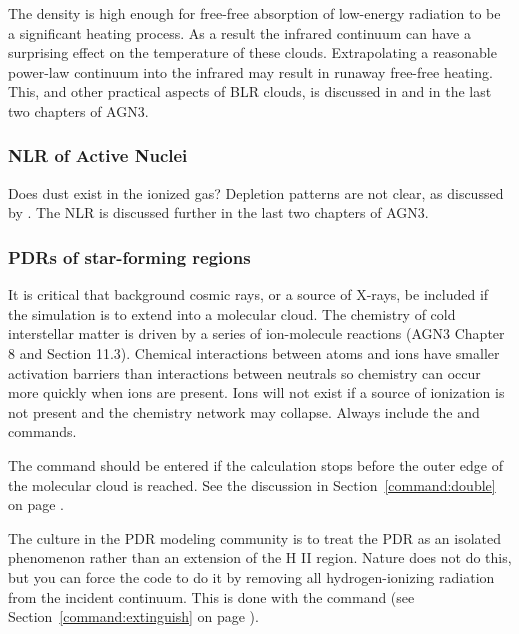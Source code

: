 \documentclass[12pt,twoside]{article}
\begin{document}
{The density is high enough for free-free absorption of low-energy
radiation to be a significant heating process.
As a result the infrared
continuum can have a surprising effect on the temperature of these clouds.
Extrapolating a reasonable power-law continuum into the infrared may result
in runaway free-free heating.
This, and other practical aspects of BLR
clouds, is discussed in \citet{FerlandBLRCloudReview99}
and in the last two chapters of AGN3.

\subsubsection{NLR of Active Nuclei}

Does dust exist in the ionized gas?  Depletion patterns are not clear,
as discussed by \citet{FergusonEtAl97}.
The NLR is discussed further in the last two chapters of AGN3.

\subsubsection{PDRs of star-forming regions}

It is critical that background cosmic rays, or a source of X-rays, be
included if the simulation is to extend into a molecular cloud.  The
chemistry of cold interstellar matter is driven by a series of ion-molecule
reactions (AGN3 Chapter 8 and Section 11.3).  Chemical interactions between
atoms and ions have smaller activation barriers than interactions between
neutrals so chemistry can occur more quickly when ions are present.  Ions
will not exist if a source of ionization is not present and the chemistry
network may collapse.
Always include the  and  commands.

The  command should be
entered if the calculation stops before
the outer edge of the molecular cloud is reached.
See the discussion in Section~\ref{command:double}
on page \pageref{command:double}.

The culture in the PDR modeling community is to treat the PDR as an
isolated phenomenon rather than an extension of the H II region.  Nature
does not do this, but you can force the code to do it by removing all
hydrogen-ionizing radiation from the incident continuum.  This is done with
the  command
(see Section~\ref{command:extinguish} on page \pageref{command:extinguish}).

}
\end{document}
